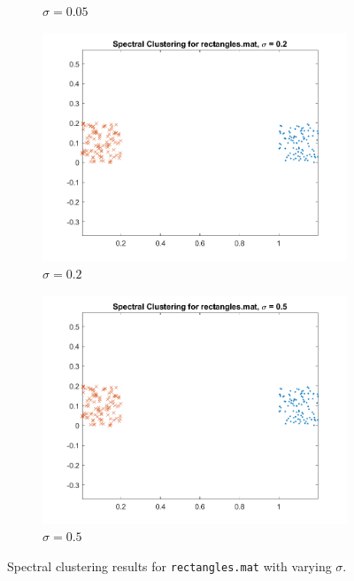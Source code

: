 \documentclass[11pt]{article}
\begin{document}
\begin{figure}[!ht]
\begin{subfigure}{0.45\textwidth}
        \caption{\(\sigma = 0.05\)}
    \end{subfigure}
    \begin{subfigure}{0.45\textwidth}
        \includegraphics[width=\linewidth]{rectangles_sigma_0.200.png}
        \caption{\(\sigma = 0.2\)}
    \end{subfigure}
    \begin{subfigure}{0.45\textwidth}
        \includegraphics[width=\linewidth]{rectangles_sigma_0.500.png}
        \caption{\(\sigma = 0.5\)}
    \end{subfigure}
    \caption{Spectral clustering results for \texttt{rectangles.mat} with varying \(\sigma\).}
    \label{fig:rectangles}
\end{figure}
\end{document}

